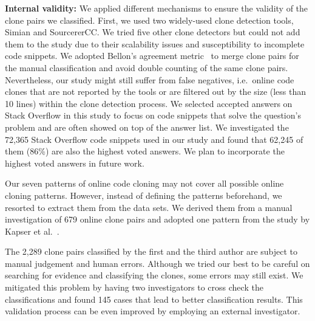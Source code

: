 \documentclass[10pt,journal,compsoc]{IEEEtran}
\begin{document}
\textbf{Internal validity:} 
We applied different mechanisms to ensure the validity of the clone pairs we
classified.  First, we used two widely-used clone detection tools, Simian and
SourcererCC.  We tried five other clone detectors but could not add them to the
study due to their scalability issues and susceptibility to incomplete code
snippets. We adopted Bellon's agreement metric~\cite{Bellon2007} to merge clone
pairs for the manual classification and avoid double counting of the same clone
pairs. Nevertheless, our study might still suffer from false negatives,
i.e.~online code clones that are not reported by the tools or are filtered out
by the size (less than 10 lines) within the clone detection process. We selected
accepted answers on Stack Overflow in this study to focus on code snippets that
solve the question's problem and are often showed on top of the answer list.
We investigated the 72,365 Stack Overflow code snippets used in our study and
found that 62,245 of them (86\%) are also the highest voted answers.
We plan to incorporate the highest voted answers in future work.



Our seven patterns of online code cloning may not cover all possible online
cloning patterns. However, instead of defining the patterns beforehand, we
resorted to extract them from the data sets. We derived them from a manual
investigation of 679 online clone pairs and adopted one pattern from the study
by Kapser et al.~\cite{Kapser2003}.

The 2,289 clone pairs classified by the first and the third author are subject
to manual judgement and human errors.  Although we tried our best to be careful
on searching for evidence and classifying the clones, some errors may still
exist. We mitigated this problem by having two investigators to cross check the
classifications and found 145 cases that lead to better classification results.
This validation process can be even improved by employing an external
investigator. 
\end{document}
